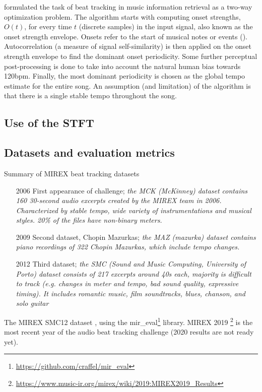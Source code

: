 \documentclass[letter,12pt,notitlepage]{article}
\begin{document}
\textcite{ellis} formulated the task of beat tracking in music information retrieval as a two-way optimization problem. The algorithm starts with computing onset strengths, $O(t)$, for every time $t$ (discrete samples) in the input signal, also known as the onset strength envelope. Onsets refer to the start of musical notes or events (\cite{onsets}). Autocorrelation (a measure of signal self-similarity) is then applied on the onset strength envelope to find the dominant onset periodicity. Some further perceptual post-processing is done to take into account the natural human bias towards 120bpm. Finally, the most dominant periodicity is chosen as the global tempo estimate for the entire song. An assumption (and limitation) of the algorithm is that there is a single stable tempo throughout the song.

\subsection{Use of the STFT}

\subsection{Datasets and evaluation metrics}

Summary of MIREX beat tracking datasets
	\begin{enumerate}
		\item[2006]
			First appearance of challenge; \textit{the MCK (McKinney) dataset contains 160 30-second audio excerpts created by the MIREX team in 2006. Characterized by stable tempo, wide variety of instrumentations and musical styles. 20\% of the files have non-binary meters.}
		\item[2009]
			Second dataset, Chopin Mazurkas; \textit{the MAZ (mazurka) dataset contains piano recordings of 322 Chopin Mazurkas, which include tempo changes.}
		\item[2012]
			Third dataset; \textit{the SMC (Sound and Music Computing, University of Porto) dataset consists of 217 excerpts around 40s each, majority is difficult to track (e.g. changes in meter and tempo, bad sound quality, expressive timing). It includes romantic music, film soundtracks, blues, chanson, and solo guitar}
	\end{enumerate}

The MIREX SMC12 dataset \cite{smcdataset}, using the mir\_eval\footnote{\href{https://github.com/craffel/mir_eval}{https://github.com/craffel/mir\_eval}} library. MIREX 2019 \footnote{\href{https://www.music-ir.org/mirex/wiki/2019:MIREX2019_Results}{https://www.music-ir.org/mirex/wiki/2019:MIREX2019\_Results}} is the most recent year of the audio beat tracking challenge (2020 results are not ready yet).
\end{document}
